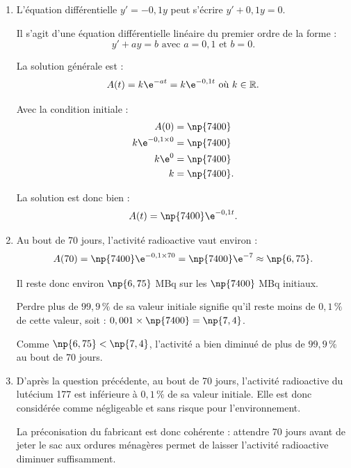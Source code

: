 \begin{enumerate}[start=7]
\item  L'équation différentielle $y' = -0,1y$ peut s'écrire $y' + 0,1y = 0$.
    
Il s'agit d'une équation différentielle linéaire du premier ordre de la forme :
\[y' + ay = b \text{ avec } a = 0,1 \text{ et } b = 0.\]

La solution générale est :
\[A(t) = k\e^{-at} = k\e^{-0,1t} \text{ où } k \in \mathbb{R}.\]

Avec la condition initiale :
\begin{align*}
A(0) &= \np{7400} \\
k\e^{-0,1\times0} &= \np{7400} \\
k\e^0 &= \np{7400} \\
k &= \np{7400}.
\end{align*}

La solution est donc bien :
\[A(t) = \np{7400}\e^{-0,1t}.\]

\item Au bout de 70 jours, l'activité radioactive vaut environ :
\[A(70)=\np{7400}\e^{-0,1\times 70}=\np{7400}\e^{-7}\approx \np{6,75}.\]

Il reste donc environ $\np{6,75}$ MBq sur les $\np{7400}$ MBq initiaux.

Perdre plus de $99,9\,\%$ de sa valeur initiale signifie qu'il reste moins de $0,1\,\%$ de cette valeur, soit : $0,001\times \np{7400}=\np{7,4}$.

Comme $\np{6,75}<\np{7,4}$, l'activité a bien diminué de plus de $99,9\,\%$ au bout de 70 jours.

\item D'après la question précédente, au bout de 70 jours, l'activité radioactive du lutécium 177 est inférieure à $0,1\,\%$ de sa valeur initiale. Elle est donc considérée comme négligeable et sans risque pour l'environnement.

La préconisation du fabricant est donc cohérente : attendre 70 jours avant de jeter le sac aux ordures ménagères permet de laisser l'activité radioactive diminuer suffisamment.
\end{enumerate}

\bigskip
